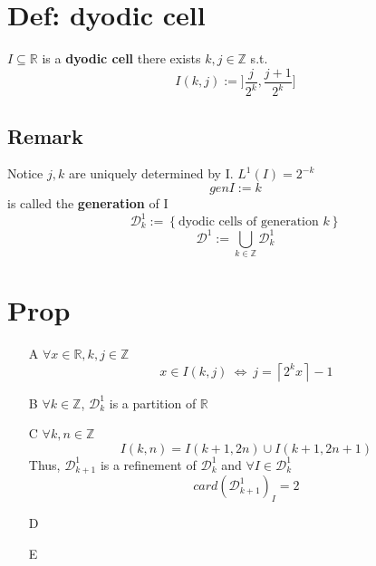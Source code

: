 \documentclass{book}
\newcommand{\rightbracket}{]}
\newcommand{\set}[1]{\left\{#1\right\}}
\begin{document}
\section{Def: dyodic cell}
$I\subseteq \mathbb R$ is a \textbf{dyodic cell} there exists $k,j\in \mathbb Z$ s.t.
$$I(k,j):=\rightbracket \frac{j}{2^k},\frac{j+1}{2^k}\rightbracket$$
\subsection*{Remark}
Notice $j,k$ are uniquely determined by I. $L^1(I)=2^{-k}$$$gen I:=k$$
is called the \textbf{generation} of I
$$\mathscr{D}_k^1:=\set{\text {dyodic cells of generation }k}$$
$$\mathscr{D}^1:=\bigcup\limits_{k\in \mathbb Z}\mathscr{D}_k^1$$
\section{Prop}
\begin{itemize}
    \item [A]$\forall x\in \mathbb R,k,j\in \mathbb Z$$$x\in I(k,j)\ \Leftrightarrow\ j=\left\lceil 2^kx \right\rceil-1$$
    \item [B]$\forall k \in \mathbb Z$, $\mathscr D^1_k$ is a partition of $\mathbb R$ 
    \item [C]$\forall k,n\in \mathbb Z$$$I(k,n)=I(k+1,2n)\cup I(k+1,2n+1)$$Thus, $\mathscr{D}^1_{k+1}$ is a refinement of $\mathscr D^1_k$ and $\forall I\in \mathscr D^1_k$$$card(\mathscr D^1_{k+1})_I=2$$
    \item [D] 
    \item [E]
\end{itemize}
\end{document}
